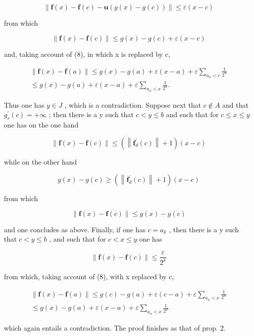 \[
\| \mathbf {f} (x) - \mathbf {f} (c) - \mathbf {u} (g (x) - g (c)) \| \leqslant \varepsilon (x - c)
\]

from which

\[
\| \mathbf {f} (x) - \mathbf {f} (c) \| \leqslant g (x) - g (c) + \varepsilon (x - c)
\]

and, taking account of (8), in which x is replaced by c,

\[
\begin{array}{c} \| \mathbf {f} (x) - \mathbf {f} (a) \| \leqslant g (x) - g (a) + \varepsilon (x - a) + \varepsilon \sum_ {a _ {n} <   c} \frac {1}{2 ^ {n}} \\ \leqslant g (x) - g (a) + \varepsilon (x - a) + \varepsilon \sum_ {a _ {n} <   x} \frac {1}{2 ^ {n}}. \end{array}
\]

Thus one has \(y \in J\) , which is a contradiction. Suppose next that \(c \notin A\) and that \(g_{r}^{\prime}(c) = +\infty\) ; then there is a y such that \(c < y \leqslant b\) and such that for \(c \leqslant x \leqslant y\) one has on the one hand

\[
\left\| \mathbf {f} (x) - \mathbf {f} (c) \right\| \leqslant \left(\left\| \mathbf {f} _ {d} ^ {\prime} (c) \right\| + 1\right) (x - c)
\]

while on the other hand

\[
g (x) - g (c) \geqslant \left(\left\| \mathbf {f} _ {d} ^ {\prime} (c) \right\| + 1\right) (x - c)
\]

from which

\[
\| \mathbf {f} (x) - \mathbf {f} (c) \| \leqslant g (x) - g (c)
\]

and one concludes as above. Finally, if one has \(c = a_{k}\) , then there is a y such that \(c < y \leqslant b\) , and such that for \(c < x \leqslant y\) one has

\[
\| \mathbf {f} (x) - \mathbf {f} (c) \| \leqslant \frac {\varepsilon}{2 ^ {k}}
\]

from which, taking account of (8), with x replaced by c,

\[
\begin{array}{c} \| \mathbf {f} (x) - \mathbf {f} (a) \| \leqslant g (c) - g (a) + \varepsilon (c - a) + \varepsilon \sum_ {a _ {n} <   x} \frac {1}{2 ^ {n}} \\ \leqslant g (x) - g (a) + \varepsilon (x - a) + \varepsilon \sum_ {a _ {n} <   x} \frac {1}{2 ^ {n}} \end{array}
\]

which again entails a contradiction. The proof finishes as that of prop. 2.

